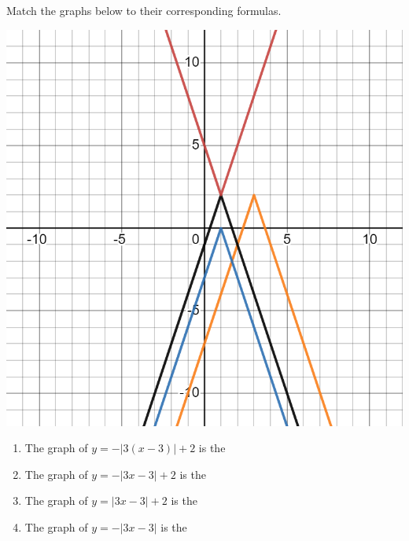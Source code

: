 \documentclass{ximera}
\author{Kenneth Berglund}
\begin{document}
\begin{exercise}
Match the graphs below to their corresponding formulas.

\includegraphics[width=1\linewidth]{FT22graph.png}

\begin{enumerate}
\item The graph of $y = -|3(x - 3)| + 2$ is the 
\begin{multipleChoice}
\end{multipleChoice}

\item The graph of $y = -|3x - 3| + 2$ is the 
\begin{multipleChoice}
\end{multipleChoice}

\item The graph of $y = |3x - 3| + 2$ is the 
\begin{multipleChoice}
\end{multipleChoice}

\item The graph of $y = -|3x - 3|$ is the 
\begin{multipleChoice}
\end{multipleChoice}
\end{enumerate}

\end{exercise}
\end{document}
